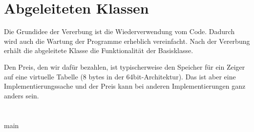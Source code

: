 \section{Abgeleiteten Klassen}
Die Grundidee der Vererbung ist die Wiederverwendung vom Code.
Dadurch wird auch die Wartung der Programme erheblich vereinfacht.
Nach der Vererbung erhält die abgeleitete Klasse die Funktionalität der Basisklasse.

Den Preis, den wir dafür bezahlen, ist typischerweise den Speicher für ein Zeiger auf eine virtuelle Tabelle (8 bytes in der 64bit-Architektur).
Das ist aber eine Implementierungssache und der Preis kann bei anderen Implementierungen ganz anders sein.


\begin{code}
	\inputminted{cpp}{code/employees_virt_cpp/main.cpp}
	\inputminted[bgcolor=white]{text}{code/employees_virt_cpp/output.txt}
\end{code}

\begin{code}
	\caption{main}
	\inputminted{c}{code/employees_virt/main.c}
	\inputminted[bgcolor=white]{text}{code/employees_virt/output.txt}
\end{code}
